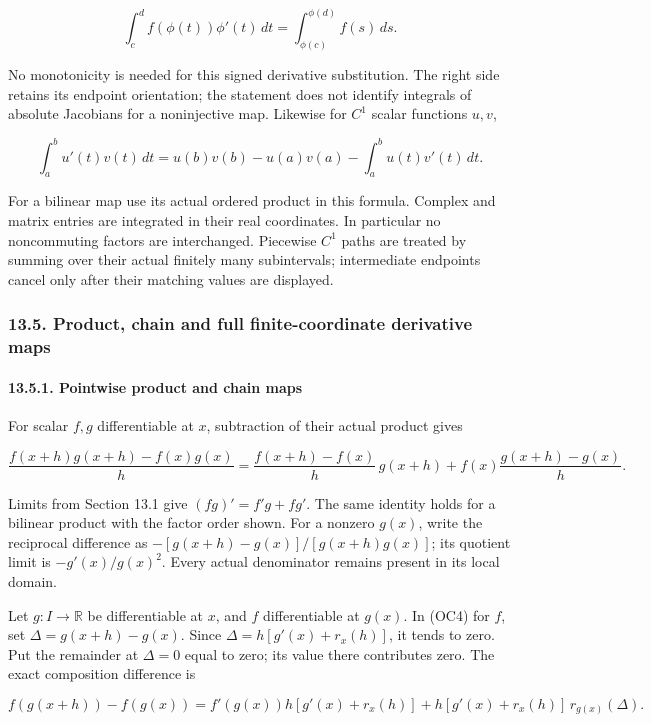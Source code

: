 \documentclass[
  11pt,
]{article}
\begin{document}
\[
 \int_c^d f(\phi(t))\phi'(t)\,dt
 =\int_{\phi(c)}^{\phi(d)}f(s)\,ds.
\tag{OC14}
\]

No monotonicity is needed for this signed derivative substitution. The
right side retains its endpoint orientation; the statement does not
identify integrals of absolute Jacobians for a noninjective map.
Likewise for \(C^1\) scalar functions \(u,v\),

\[
 \int_a^b u'(t)v(t)\,dt
 =u(b)v(b)-u(a)v(a)-\int_a^b u(t)v'(t)\,dt.
\tag{OC15}
\]

For a bilinear map use its actual ordered product in this formula.
Complex and matrix entries are integrated in their real coordinates. In
particular no noncommuting factors are interchanged. Piecewise \(C^1\)
paths are treated by summing over their actual finitely many
subintervals; intermediate endpoints cancel only after their matching
values are displayed.

\subsubsection{13.5. Product, chain and full finite-coordinate
derivative
maps}\label{product-chain-and-full-finite-coordinate-derivative-maps}

\paragraph{13.5.1. Pointwise product and chain
maps}\label{pointwise-product-and-chain-maps}

For scalar \(f,g\) differentiable at \(x\), subtraction of their actual
product gives

\[
 \frac{f(x+h)g(x+h)-f(x)g(x)}h
 =\frac{f(x+h)-f(x)}h\,g(x+h)
   +f(x)\frac{g(x+h)-g(x)}h.
\tag{OC16}
\]

Limits from Section 13.1 give \((fg)'=f'g+fg'\). The same identity holds
for a bilinear product with the factor order shown. For a nonzero
\(g(x)\), write the reciprocal difference as
\(-[g(x+h)-g(x)]/[g(x+h)g(x)]\); its quotient limit is
\(-g'(x)/g(x)^2\). Every actual denominator remains present in its local
domain.

Let \(g:I\to\mathbb R\) be differentiable at \(x\), and \(f\)
differentiable at \(g(x)\). In (OC4) for \(f\), set
\(\Delta=g(x+h)-g(x)\). Since \(\Delta=h[g'(x)+r_x(h)]\), it tends to
zero. Put the remainder at \(\Delta=0\) equal to zero; its value there
contributes zero. The exact composition difference is

\[
 f(g(x+h))-f(g(x))
 =f'(g(x))h[g'(x)+r_x(h)]
   +h[g'(x)+r_x(h)]\,r_{g(x)}(\Delta).
\tag{OC17}
\]
\end{document}
